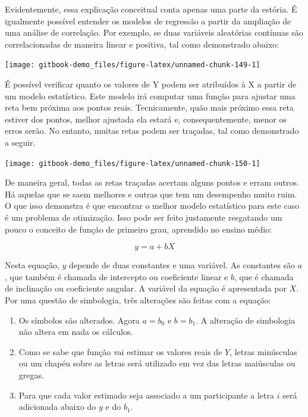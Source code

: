 \documentclass[
]{book}
\begin{document}
Evidentemente, essa explicação conceitual conta apenas uma parte da estória. É igualmente possível entender os modelos de regressão a partir da ampliação de uma análise de correlação. Por exemplo, se duas variáveis aleatórias contínuas são correlacionadas de maneira linear e positiva, tal como demonstrado abaixo:

\begin{center}\texttt{[image: gitbook-demo\_files/figure-latex/unnamed-chunk-149-1]} \end{center}

É possível verificar quanto os valores de Y podem ser atribuídos à X a partir de um modelo estatístico. Este modelo irá computar uma função para ajustar uma reta bem próxima aos pontos reais. Tecnicamente, quão mais próximo essa reta estiver dos pontos, melhor ajustada ela estará e, consequentemente, menor os erros serão. No entanto, muitas retas podem ser traçadas, tal como demonstrado a seguir.

\begin{center}\texttt{[image: gitbook-demo\_files/figure-latex/unnamed-chunk-150-1]} \end{center}

De maneira geral, todas as retas traçadas acertam alguns pontos e erram outros. Há aquelas que se saem melhores e outras que tem um desempenho muito ruim. O que isso demonstra é que encontrar o melhor modelo estatístico para este caso é um problema de otimização. Isso pode ser feito justamente resgatando um pouco o conceito de função de primeiro grau, aprendido no ensino médio:

\[y = a + bX\]

Nesta equação, \(y\) depende de duas constantes e uma variável. As constantes são \(a\), que também é chamada de intercepto ou coeficiente linear e \(b\), que é chamada de inclinação ou coeficiente angular. A variável da equação é apresentada por \(X\). Por uma questão de simbologia, três alterações são feitas com a equação:

\begin{enumerate}
\def\labelenumi{(\roman{enumi})}
\item
  Os símbolos são alterados. Agora \(a = b_0\) e \(b = b_1\). A alteração de simbologia não altera em nada os cálculos.
\item
  Como se sabe que função vai estimar os valores reais de \(Y\), letras minúsculas ou um chapéu sobre as letras será utilizado em vez das letras maiúsculas ou gregas.
\item
  Para que cada valor estimado seja associado a um participante a letra \(i\) será adicionada abaixo do \(y\) e do \(b_1\).
\end{enumerate}
\end{document}
